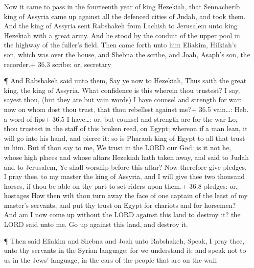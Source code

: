 Now it came to pass in the fourteenth year of king
Hezekiah, that Sennacherib king of Assyria came up against all the
defenced cities of Judah, and took them.  And the king of
Assyria sent Rabshakeh from Lachish to Jerusalem unto king Hezekiah with
a great army. And he stood by the conduit of the upper pool in the
highway of the fuller's field.  Then came forth unto him
Eliakim, Hilkiah's son, which was over the house, and Shebna the scribe,
and Joah, Asaph's son, the recorder.+ 36.3 scribe: or, secretary

 ¶ And Rabshakeh said unto them, Say ye now to Hezekiah,
Thus saith the great king, the king of Assyria, What confidence is this
wherein thou trustest?  I say, sayest thou, (but they are
but vain words) I have counsel and strength for war: now on whom dost
thou trust, that thou rebellest against me?+ 36.5 vain\ldots: Heb. a
word of lips+ 36.5 I have\ldots: or, but counsel and strength are for
the war  Lo, thou trustest in the staff of this broken reed,
on Egypt; whereon if a man lean, it will go into his hand, and pierce
it: so is Pharaoh king of Egypt to all that trust in him. 
But if thou say to me, We trust in the LORD our God: is it not he, whose
high places and whose altars Hezekiah hath taken away, and said to Judah
and to Jerusalem, Ye shall worship before this altar?  Now
therefore give pledges, I pray thee, to my master the king of Assyria,
and I will give thee two thousand horses, if thou be able on thy part to
set riders upon them.+ 36.8 pledges: or, hostages  How then
wilt thou turn away the face of one captain of the least of my master's
servants, and put thy trust on Egypt for chariots and for horsemen?
 And am I now come up without the LORD against this land to
destroy it? the LORD said unto me, Go up against this land, and destroy
it.

 ¶ Then said Eliakim and Shebna and Joah unto Rabshakeh,
Speak, I pray thee, unto thy servants in the Syrian language; for we
understand it: and speak not to us in the Jews' language, in the ears of
the people that are on the wall.

